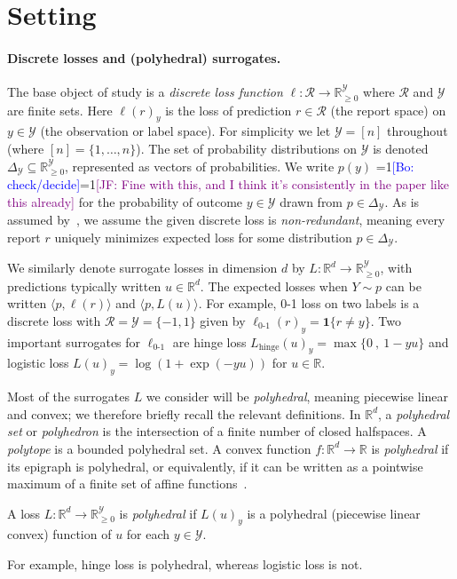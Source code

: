 \documentclass[anon]{colt2020} %
\newcommand{\Comments}{1}
\newcommand{\mynote}[2]{\ifnum\Comments=1\textcolor{#1}{#2}\fi}
\newcommand{\jessie}[1]{\mynote{purple}{[JF: #1]}}
\newcommand{\bo}[1]{\mynote{blue}{[Bo: #1]}}
\newcommand{\reals}{\mathbb{R}}
\newcommand{\nonnegreals}{\reals_{\geq 0}}%
\newcommand{\simplex}{\Delta_\Y}
\newcommand{\R}{\mathcal{R}}
\newcommand{\Y}{\mathcal{Y}}
\newcommand{\hinge}{L_{\mathrm{hinge}}}
\newcommand{\ellzo}{\ell_{\text{0-1}}}
\newcommand{\inprod}[2]{\langle #1, #2 \rangle}%
\newcommand{\Ind}[1]{\mathbf{1}\{#1\}}
\begin{document}
\section{Setting}

\paragraph{Discrete losses and (polyhedral) surrogates.}

The base object of study is a \emph{discrete loss function} $\ell: \R \to \nonnegreals^{\Y}$ where $\R$ and $\Y$ are finite sets.
Here $\ell(r)_y$ is the loss of prediction $r \in \R$ (the report space) on $y \in \Y$ (the observation or label space).
For simplicity we let $\Y = [n]$ throughout (where $[n] = \{1,\ldots,n\}$).
The set of probability distributions on $\Y$ is denoted $\simplex\subseteq\nonnegreals^{\Y}$, represented as vectors of probabilities.
We write $p(y)$ \bo{check/decide}\jessie{Fine with this, and I think it's consistently in the paper like this already} for the probability of outcome $y \in \Y$ drawn from $p \in \simplex$.
As is assumed by~\cite{finocchiaro2019embedding}, we assume the given discrete loss is \emph{non-redundant}, meaning every report $r$ uniquely minimizes expected loss for some distribution $p\in\simplex$.

We similarly denote surrogate losses in dimension $d$ by $L:\reals^d\to\nonnegreals^{\Y}$, with predictions typically written $u\in\reals^d$.
The expected losses when $Y \sim p$ can be written $\inprod{p}{\ell(r)}$ and $\inprod{p}{L(u)}$.
For example, 0-1 loss on two labels is a discrete loss with $\R = \Y = \{-1,1\}$
given by $\ellzo(r)_y = \Ind{r \neq y}$.
Two important surrogates for $\ellzo$ are hinge loss $\hinge(u)_y = \max\{ 0 ~,~ 1-yu \}$ and logistic loss $L(u)_y = \log(1+\exp(-yu))$ for $u\in\reals$.

Most of the surrogates $L$ we consider will be \emph{polyhedral}, meaning piecewise linear and convex; we therefore briefly recall the relevant definitions.
In $\reals^d$, a \emph{polyhedral set} or \emph{polyhedron} is the intersection of a finite number of closed halfspaces.
A \emph{polytope} is a bounded polyhedral set.
A convex function $f:\reals^d\to\reals$ is \emph{polyhedral} if its epigraph is polyhedral, or equivalently, if it can be written as a pointwise maximum of a finite set of affine functions~\citep{rockafellar1997convex}.
%
\begin{definition}
	A loss $L: \reals^d \to \nonnegreals^{\Y}$ is \emph{polyhedral} if $L(u)_y$ is a polyhedral (piecewise linear convex) function of $u$ for each $y\in\Y$.
\end{definition}
%
For example, hinge loss is polyhedral, whereas logistic loss is not.
\end{document}
